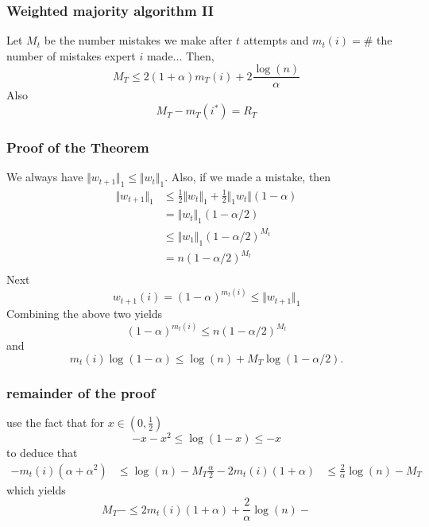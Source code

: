 \documentclass{beamer}
\begin{document}
\begin{frame}
  \frametitle{Weighted majority algorithm II}
  \begin{theorem}
    Let $M_t$ be the number mistakes we make after $t$ attempts and
    $m_t(i) = \#$ the number of mistakes expert $i$ made...
    Then,
    \begin{equation}
      M_T \le 2(1+\alpha) m_T(i) + 2 \frac{\log(n)}{\alpha}
    \end{equation}
    Also
    \begin{equation}
      M_T -m_T(i^*) = R_T
    \end{equation}

  \end{theorem}
\end{frame}

\begin{frame}
  \frametitle{Proof of the Theorem}
  We always have $ \Vert w_{t+1} \Vert_1 \le \Vert w_t \Vert_1$. Also, if we made a mistake, then
  \begin{equation}
    \begin{aligned}
      \Vert w_{t+1} \Vert_1 &\le \frac12 \Vert w_t \Vert_1 + \frac12 \Vert_1 w_t \Vert (1-\alpha) \\
      &= \Vert w_t \Vert_1 (1-\alpha/2) \\
      &\le \Vert w_1 \Vert_1 (1-\alpha/2)^{M_t} \\
      &= n (1-\alpha/2)^{M_t} \\
    \end{aligned}
  \end{equation}
  Next
  \begin{equation}
    w_{t+1}(i) = (1-\alpha)^{m_t(i)} \le \Vert w_{t+1} \Vert_1
  \end{equation}
  Combining the above two yields
  \begin{equation}
    {(1-\alpha)}^{m_t(i)} \le n (1-\alpha/2)^{M_t}
  \end{equation}
  and
  \begin{equation}
    m_t(i) \log(1-\alpha) \le \log(n) + M_T \log(1-\alpha/2).
  \end{equation}
\end{frame}

%
\begin{frame}
  \frametitle{remainder of the proof}
  use the fact that for $x\in (0,\frac12)$
  \begin{equation}
    -x -x^2 \le \log(1-x) \le -x
  \end{equation}
  to deduce that
  \begin{equation}
    \begin{aligned}
    - m_t(i) (\alpha+\alpha^2) &\le \log(n) - M_T \frac{\alpha}{2}
    -2 m_t(i) (1+\alpha) &\le \frac{2}{\alpha}\log(n) - M_T
    \end{aligned}
  \end{equation}
  which yields
  \begin{equation}
    M_T -  \le 2 m_t(i) (1+\alpha) + \frac{2}{\alpha}\log(n) -
  \end{equation}

\end{frame}
\end{document}
